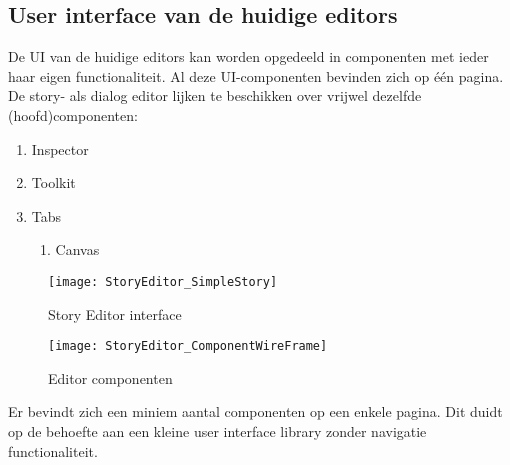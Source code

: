 \subsection{User interface van de huidige editors}
De UI van de huidige editors kan worden opgedeeld in componenten met ieder haar eigen functionaliteit. Al deze UI-componenten bevinden zich op één pagina. De story- als dialog editor lijken te beschikken over vrijwel dezelfde (hoofd)componenten:
\begin{enumerate}
    \item Inspector
    \item Toolkit
    \item Tabs
    \begin{enumerate}
        \item Canvas
    \end{enumerate}
\end{enumerate}

\begin{figure}[H]
    \begin{minipage}[b]{0.45\textwidth}
        \texttt{[image: StoryEditor\_SimpleStory]}
        \caption{Story Editor interface}
        \label{fig:storyeditorinterface}
    \end{minipage}
    \hfill
    \begin{minipage}[b]{0.45\textwidth}
        \texttt{[image: StoryEditor\_ComponentWireFrame]}
        \caption{Editor componenten}
        \label{fig:storyeditorcomponents}
    \end{minipage}
\end{figure}

Er bevindt zich een miniem aantal componenten op een enkele pagina. Dit duidt op de behoefte aan een kleine user interface library zonder navigatie functionaliteit.



